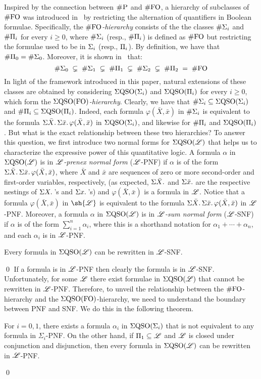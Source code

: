 
Inspired by the connection between $\text{\sc \#P}$ and $\#{\rm FO}$, a hierarchy of subclasses of $\#{\rm FO}$ was introduced in~\cite{SalujaST95} 
by restricting the alternation of quantifiers in Boolean formulae.
Specifically, the \emph{$\#{\rm FO}$-hierarchy} consists of the 
the classes $\#\Sigma_{i}$ and $\#\Pi_{i}$ for every $i \geq 0$, where $\#\Sigma_{i}$ (resp., $\#\Pi_{i}$) is defined as $\#{\rm FO}$ but restricting the formulae used to be in $\Sigma_{i}$ (resp., $\Pi_{i}$).
By definition, we have that $\#\Pi_{0} = \#\Sigma_{0}$. Moreover, it is shown in~\cite{SalujaST95} that:
\[
\#\Sigma_{0} \; \subsetneq \; \#\Sigma_{1} \; \subsetneq \; \#\Pi_{1} \; \subsetneq \; \#\Sigma_{2} \; \subsetneq \; \#\Pi_{2} \; = \; \#{\rm FO} 
\]
In light of the framework introduced in this paper, natural extensions of these classes are obtained by considering 
$\Sigma{\rm QSO}(\Sigma_{i})$ and $\Sigma{\rm QSO}(\Pi_{i})$ for every $i \geq 0$, which form the \emph{$\Sigma{\rm QSO}({\rm FO})$-hierarchy}.
Clearly, we have that $\#\Sigma_{i} \subseteq \Sigma{\rm QSO}(\Sigma_{i})$ and $\#\Pi_{i} \subseteq \Sigma{\rm QSO}(\Pi_{i})$. Indeed, each formula $\varphi(\bar{X}, \bar{x})$ in $\#\Sigma_{i}$ is equivalent to the formula $\Sigma{\bar X}.\, \Sigma{\bar x}.\, \varphi(\bar{X}, \bar{x})$ in $\Sigma{\rm QSO}(\Sigma_{i})$, and likewise for $\#\Pi_{i}$ and $\Sigma{\rm QSO}(\Pi_{i})$.
But what is the exact relationship between these two hierarchies?
To answer this question, we first introduce two normal forms for $\Sigma{\rm QSO}(\mathscr{L})$ that helps us to characterize the expressive power of this quantitative logic.
A formula $\alpha$ in $\Sigma{\rm QSO}(\mathscr{L})$ is in \emph{$\mathscr{L}$-prenex normal form} ($\mathscr{L}$-PNF) 
if $\alpha$ is of the form
$\Sigma{\bar{X}}.\, \Sigma{\bar{x}}.\, \varphi(\bar{X}, \bar{x})$,
where $\bar{X}$ and $\bar{x}$ are sequences of zero or more second-order and first-order variables, respectively, (as expected, $\Sigma{\bar{X}}.\,\!$ and $\Sigma{\bar{x}}.\,\!$ are the respective nestings of $\Sigma{X}.\,$'s and $\Sigma{x}.\,$'s) and $\varphi(\bar{X}, \bar{x})$ is a formula in $\mathscr{L}$. Notice that 
a formula $\varphi(\bar{X}, \bar{x})$ in $\sh{\LL}$ is equivalent to the formula $\Sigma{\bar X}.\, \Sigma{\bar x}.\, \varphi(\bar{X}, \bar{x})$ in $\mathscr{L}$-PNF. 
Moreover, a formula $\alpha$ in $\Sigma{\rm QSO}(\mathscr{L})$ is in \emph{$\mathscr{L}$-sum normal form} ($\mathscr{L}$-SNF) if $\alpha$ is of the form $\sum_{i=1}^n \alpha_i$, where this is a shorthand notation for $\alpha_1+\cdots+\alpha_n$, and each $\alpha_i$ is in $\mathscr{L}$-PNF. 
\begin{prop}\label{theo-pnf-snf}
Every formula in $\Sigma{\rm QSO}(\mathscr{L})$ can be rewritten in $\mathscr{L}$-SNF.
\end{prop}
\proof

\qed
If a formula is in $\mathscr{L}$-PNF then clearly the formula is in $\mathscr{L}$-SNF.
Unfortunately, for some $\mathscr{L}$ there exist formulae in $\Sigma{\rm QSO}(\mathscr{L})$  that cannot be rewritten in $\mathscr{L}$-PNF.
Therefore, to unveil the relationship between the $\#{\rm FO}$-hierarchy and the $\Sigma{\rm QSO}({\rm FO})$-hierarchy, we need to understand the boundary between PNF and SNF. We do this in the following theorem. 
\begin{thm}\label{theo-pi1-pnf}
For $i = 0,1$, there exists a formula $\alpha_i$ in $\Sigma{\rm QSO}(\Sigma_{i})$ that is not equivalent to any formula in $\Sigma_i$-PNF. 
On the other hand, if $\Pi_{1} \subseteq \mathscr{L}$ and $\mathscr{L}$ is closed under conjunction and disjunction, then every formula in $\Sigma{\rm QSO}(\mathscr{L})$ can be rewritten in $\mathscr{L}$-PNF. 
\end{thm}
\proof

\qed


